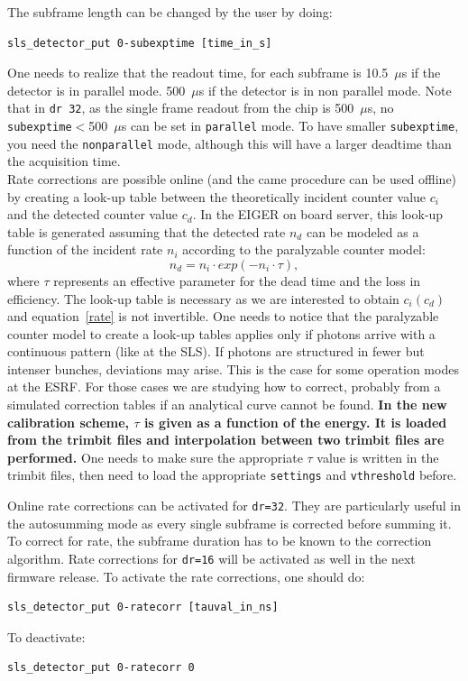 \documentclass{article}
\begin{document}
The subframe length can be changed by the user by doing: 
\begin{verbatim}
sls_detector_put 0-subexptime [time_in_s] 
\end{verbatim}

One needs to realize that the readout time, for each subframe is 10.5~$\mu$s if the detector is in parallel mode. 500~$\mu$s if the detector is in non parallel mode. Note that in {\tt{dr 32}}, as the single frame readout from the chip is 500~$\mu$s, no {\tt{subexptime}}$<$500~$\mu$s can be set in {\tt{parallel}} mode. To have smaller {\tt{subexptime}}, you need the {\tt{nonparallel}} mode, although this will have a larger deadtime than the acquisition time.\\

Rate corrections are possible online (and the came procedure can be used offline) by creating a look-up table between the theoretically incident counter value $c_i$ and the detected counter value $c_d$. 
In the EIGER on board server, this look-up table is generated assuming that the detected rate $n_d$ can be modeled as a function of the incident rate $n_i$ according to the paralyzable counter model:
\begin{equation}
n_d= n_i \cdot exp(-n_i \cdot \tau),
\label{rate}
\end{equation}
where $\tau$ represents an effective parameter for the dead time and the loss in efficiency. The look-up table is necessary as we are interested to obtain $c_i(c_d)$ and equation~\ref{rate} is not invertible. One needs to notice that the paralyzable counter model to create a look-up tables applies only if photons arrive with a continuous pattern (like at the SLS). If photons are structured in fewer but intenser bunches, deviations may arise. This is the case for some operation modes at the ESRF. For those cases we are studying how to correct, probably from a simulated correction tables if an analytical curve cannot be found.  
\textbf{In the new calibration scheme, $\tau$ is given as a function of the energy. It is loaded from the trimbit files and interpolation between two trimbit files are performed.} One needs to make sure the appropriate $\tau$ value is written in the trimbit files, then need to load the appropriate {\tt{settings}} and {\tt{vthreshold}} before.

Online rate corrections can be activated for {\tt{dr=32}}. They are particularly useful in the autosumming mode as  every single subframe is corrected before summing it. To correct for rate, the subframe duration has to be known to the correction algorithm. Rate corrections for {\tt{dr=16}} will be activated as well in the next firmware release.     
To activate the rate corrections, one should do:\\
\begin{verbatim}
sls_detector_put 0-ratecorr [tauval_in_ns]
\end{verbatim}
To deactivate:
\begin{verbatim}
sls_detector_put 0-ratecorr 0
\end{verbatim}
\end{document}

